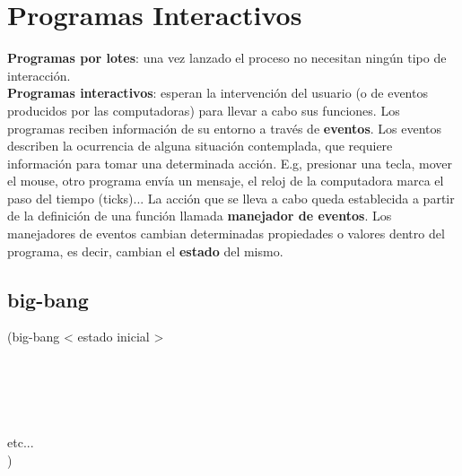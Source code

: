 \documentclass[11pt,a4paper]{article}
\begin{document}
\section{Programas Interactivos}
\textbf{Programas por lotes}: una vez lanzado el proceso no necesitan ningún tipo de interacción.\\
\textbf{Programas interactivos}: esperan la intervención del usuario (o de eventos producidos por las computadoras) para llevar a cabo sus funciones. Los programas reciben información de su entorno a través de \textbf{eventos}. Los eventos describen la ocurrencia de alguna situación contemplada, que requiere información para tomar una determinada acción. E.g, presionar una tecla, mover el mouse, otro programa env\'ia un mensaje, el reloj de la computadora marca el paso del tiempo (ticks)... La acción que se lleva a cabo queda establecida a partir de la definición de una función llamada \textbf{manejador de eventos}. Los manejadores de eventos cambian determinadas propiedades o valores dentro del programa, es decir, cambian el \textbf{estado} del mismo.

\subsection{big-bang}
\begin{siderules}
(big-bang < estado inicial >\\
\indent {}\\
\indent {}\\
\indent {}\\
\indent {}\\
\indent {}\\
\indent \indent etc...\\
\indent \indent )
\end{siderules}
\end{document}
